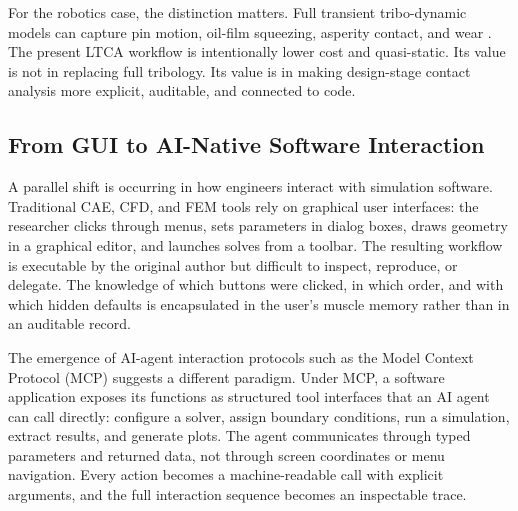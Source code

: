 \documentclass{article}
\begin{document}
For the robotics case, the distinction matters. Full transient tribo-dynamic models can capture pin motion, oil-film squeezing, asperity contact, and wear \citep{li2025tribodynamics}. The present LTCA workflow is intentionally lower cost and quasi-static. Its value is not in replacing full tribology. Its value is in making design-stage contact analysis more explicit, auditable, and connected to code.

\subsection{From GUI to AI-Native Software Interaction}

A parallel shift is occurring in how engineers interact with simulation software. Traditional CAE, CFD, and FEM tools rely on graphical user interfaces: the researcher clicks through menus, sets parameters in dialog boxes, draws geometry in a graphical editor, and launches solves from a toolbar. The resulting workflow is executable by the original author but difficult to inspect, reproduce, or delegate. The knowledge of which buttons were clicked, in which order, and with which hidden defaults is encapsulated in the user's muscle memory rather than in an auditable record.

The emergence of AI-agent interaction protocols such as the Model Context Protocol (MCP) \citep{anthropic2024mcp} suggests a different paradigm. Under MCP, a software application exposes its functions as structured tool interfaces that an AI agent can call directly: configure a solver, assign boundary conditions, run a simulation, extract results, and generate plots. The agent communicates through typed parameters and returned data, not through screen coordinates or menu navigation. Every action becomes a machine-readable call with explicit arguments, and the full interaction sequence becomes an inspectable trace.
\end{document}
